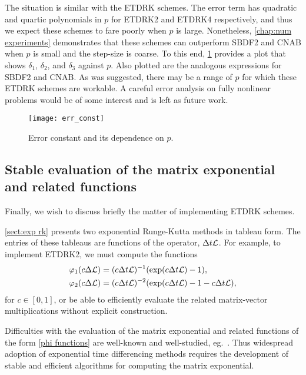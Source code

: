 The situation is similar with the ETDRK schemes. The error term has quadratic and quartic polynomials in $p$ for ETDRK2 and ETDRK4 respectively, and thus we expect these schemes to fare poorly when $p$ is large. Nonetheless, \cref{chap:num experiments} demonstrates that these schemes can outperform SBDF2 and CNAB when $p$ is small and the step-size is coarse. To this end, \cref{fig:err p dep} provides a plot that shows $\delta_1$, $\delta_2$, and $\delta_3$ against $p$. Also plotted are the analogous expressions for SBDF2 and CNAB. As was suggested, there may be a range of $p$ for which these ETDRK schemes are workable. A careful error analysis on fully nonlinear problems would be of some interest and is left as future work.

\begin{figure}[htb!]
        \centering
\texttt{[image: err\_const]}
\caption[Error constant and its dependence on $p$.]{Error constant and its dependence on $p$. }
\label{fig:err p dep}
\end{figure}

\subsection{Stable evaluation of the matrix exponential and related functions}
Finally, we wish to discuss briefly the matter of implementing ETDRK schemes.

\cref{sect:exp rk} presents two exponential Runge-Kutta methods in tableau form. The entries of these tableaus are functions of the operator, $\Delta t\mathcal{L}$. For example, to implement ETDRK2, we must compute the functions 
\begin{align}
\varphi_1(c\Delta \mathcal{L}) &= (c\Delta t \mathcal{L})^{-1}(\exp(c\Delta t \mathcal{L}) - 1),
\\
\varphi_2(c\Delta \mathcal{L}) &= (c\Delta t\mathcal{L})^{-2}(\exp(c\Delta t \mathcal{L})  -1 - c\Delta t \mathcal{L}) ,
\end{align}
for $c \in [0,1]$, or be able to efficiently evaluate the related matrix-vector multiplications without explicit construction.

Difficulties with the evaluation of the matrix exponential and related functions of the form \cref{phi functions} are well-known and well-studied, eg.\ \cite{moler2003nineteen,higham2002accuracy,higham2008functions,hochbruck1997krylov}. Thus widespread adoption of exponential time differencing methods requires the development of stable and efficient algorithms for computing the matrix exponential. 

